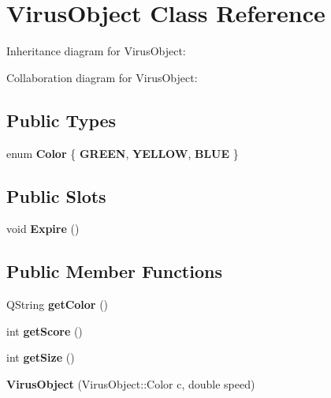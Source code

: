 \hypertarget{classVirusObject}{}\section{Virus\+Object Class Reference}
\label{classVirusObject}


Inheritance diagram for Virus\+Object\+:


Collaboration diagram for Virus\+Object\+:
\subsection*{Public Types}
\begin{DoxyCompactItemize}
\item 
\mbox{\label{classVirusObject_aaa5f4d0c62dc440075a3a3bdf2eb5638}} 
enum {\bfseries Color} \{ {\bfseries G\+R\+E\+EN}, 
{\bfseries Y\+E\+L\+L\+OW}, 
{\bfseries B\+L\+UE}
 \}
\end{DoxyCompactItemize}
\subsection*{Public Slots}
\begin{DoxyCompactItemize}
\item 
\mbox{\label{classVirusObject_a90bb071dbf5c8ec544466f1e5b8fa7ac}} 
void {\bfseries Expire} ()
\end{DoxyCompactItemize}
\subsection*{Public Member Functions}
\begin{DoxyCompactItemize}
\item 
\mbox{\label{classVirusObject_a29dc5c7a7acb2a8c29c3e22ea0350035}} 
Q\+String {\bfseries get\+Color} ()
\item 
\mbox{\label{classVirusObject_aaff81b3029f927fbce8e066a982da97b}} 
int {\bfseries get\+Score} ()
\item 
\mbox{\label{classVirusObject_a0c2e1ad387f8888977c7c9d4c3d51ece}} 
int {\bfseries get\+Size} ()
\item 
\mbox{\label{classVirusObject_ac37483ccb4d3814c67adf78e6497f667}} 
{\bfseries Virus\+Object} (Virus\+Object\+::\+Color c, double speed)
\end{DoxyCompactItemize}
